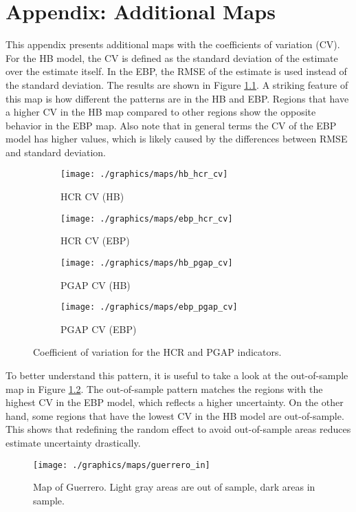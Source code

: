 \chapter{Appendix: Additional Maps}
\label{appendix:cv_maps}

This appendix presents additional maps with the coefficients of variation (CV).
For the HB model, the CV is defined as the standard deviation of the estimate over the estimate itself.
In the EBP, the RMSE of the estimate is used instead of the standard deviation.
The results are shown in Figure \ref{fig:cv_maps}.
A striking feature of this map is how different the patterns are in the HB and EBP.
Regions that have a higher CV in the HB map compared to other regions show the opposite behavior in the EBP map.
Also note that in general terms the CV of the EBP model has higher values, which is likely caused by the differences between RMSE and standard deviation.


\begin{figure}[h]
    \begin{subfigure}{0.49\linewidth}
        \centering
        \texttt{[image: ./graphics/maps/hb\_hcr\_cv]}
        \caption{HCR CV (HB)}
    \end{subfigure}
    \begin{subfigure}{0.49\linewidth}
        \centering
        \texttt{[image: ./graphics/maps/ebp\_hcr\_cv]}
        \caption{HCR CV (EBP)}
    \end{subfigure}

    \begin{subfigure}{0.49\linewidth}
        \centering
        \texttt{[image: ./graphics/maps/hb\_pgap\_cv]}
        \caption{PGAP CV (HB)}
    \end{subfigure}
    \begin{subfigure}{0.49\linewidth}
        \centering
        \texttt{[image: ./graphics/maps/ebp\_pgap\_cv]}
        \caption{PGAP CV (EBP)}
    \end{subfigure}
    \caption{Coefficient of variation for the HCR and PGAP indicators.}
    \label{fig:cv_maps}
\end{figure}

To better understand this pattern, it is useful to take a look at the out-of-sample map in Figure \ref{fig:guerrero_in}.
The out-of-sample pattern matches the regions with the highest CV in the EBP model, which reflects a higher uncertainty.
On the other hand, some regions that have the lowest CV in the HB model are out-of-sample.
This shows that redefining the random effect to avoid out-of-sample areas reduces estimate uncertainty drastically.


\begin{figure}
    \centering
    \texttt{[image: ./graphics/maps/guerrero\_in]}
       \caption[Map of Guerrero with in and out-of-sample areas]{Map of Guerrero. Light gray areas are out of sample, dark areas in sample.}
    \label{fig:guerrero_in}
\end{figure}